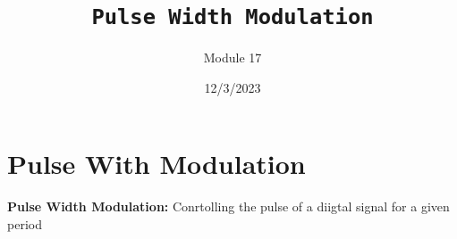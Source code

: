 \documentclass[a4paper,12pt]{article}
\title{\texttt{Pulse Width Modulation}\\\hrulefill}
\author{Module 17}
\date{\small{12/3/2023}}
\begin{document}
    \maketitle

    \section{Pulse With Modulation}
        \textbf{Pulse Width Modulation:} Conrtolling the pulse of a diigtal signal for a given period
\end{document}
